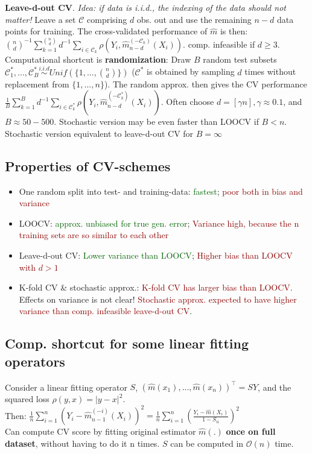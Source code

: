 \vspace{-0.5\baselineskip}
\textbf{Leave-d-out CV}. \emph{Idea: if data is i.i.d., the indexing of the data should not matter!} Leave a set $\mathcal{C}$ comprising $d$ obs. out and use the remaining $n-d$ data points for training. The cross-validated performance of $\hat{m}$ is then: $\binom{n}{d}^{-1} \sum_{k=1}^{\binom{n}{d}}d^{-1} \sum_{i \in \mathcal{C}_k} \rho \left(Y_i, \hat{m}_{n-d}^{(-\mathcal{C}_k)}(X_i)  \right)$. \textrightarrow comp. infeasible if $d \geq 3$. \\ 
Computational shortcut is \textbf{randomization}: Draw $B$ random test subsets $\mathcal{C}^*_1,...,\mathcal{C}^*_B \overset{i.i.d}{\sim} Unif(\{1,...,\binom{n}{d}\})$ ($\mathcal{C}^*$ is obtained by sampling $d$ times without replacement from $\{1,...,n\}$). The random approx. then gives the CV performance $\frac{1}{B}\sum_{k=1}^B d^{-1}\sum_{i \in \mathcal{C}^*_k} \rho \left( Y_i, \hat{m}^{(-\mathcal{C}_k^*)}_{n-d}(X_i) \right)$. Often choose $d=[\gamma n], \gamma \approx 0.1$, and $B \approx 50-500$. Stochastic version may be even faster than LOOCV if $B < n$. Stochastic version equivalent to leave-d-out CV for $B = \infty$\\
\vspace{-0.9\baselineskip}
\subsection*{Properties of CV-schemes}
\begin{itemize}
    \item One random split into test- and training-data: \textcolor{darkgreen}{fastest}; \textcolor{darkred}{poor both in bias and variance}
    \item LOOCV: \textcolor{darkgreen}{approx. unbiased for true gen. error}; \textcolor{darkred}{Variance high, because the n training sets are so similar to each other}
    \item Leave-d-out CV: \textcolor{darkgreen}{Lower variance than LOOCV}; \textcolor{darkred}{Higher bias than LOOCV with $d>1$}
    \item K-fold CV \& stochastic approx.: \textcolor{darkred}{K-fold CV has larger bias than LOOCV.} Effects on variance is not clear! \textcolor{darkred}{Stochastic approx. expected to have higher variance than comp. infeasible leave-d-out CV}. 
\end{itemize}

\subsection*{Comp. shortcut for some linear fitting operators}
Consider a linear fitting operator $S$, $(\hat{m}(x_1),...,\hat{m}(x_n))^\intercal=SY$, and the squared loss $\rho(y,x)=|y-x|^2$. \\
Then: $\frac{1}{n}\sum_{i=1}^n \left(Y_i-\hat{m}^{(-i)}_{n-1}(X_i) \right)^2 = \frac{1}{n} \sum_{i=1}^n\left( \frac{Y_i-\hat{m}(X_i)}{1-S_{ii}} \right)^2$ \\
\textrightarrow Can compute CV score by fitting original estimator $\hat{m}(.)$ \textbf{once on full dataset}, without having to do it n times. $S$ can be computed in $\mathcal{O}(n)$ time.